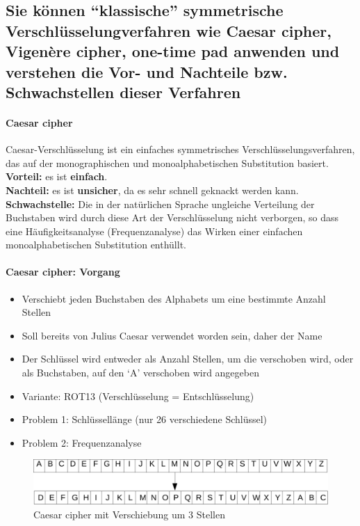 \documentclass[10pt,a4paper]{article}
\begin{document}
\subsection*{Sie können "`klassische"' symmetrische Verschlüsselungverfahren wie Caesar cipher, Vigenère cipher, one-time pad anwenden und verstehen die Vor- und Nachteile bzw. Schwachstellen dieser Verfahren}

\paragraph*{Caesar cipher}\label{para:Caesar cipher}Caesar-Verschlüsselung ist ein einfaches symmetrisches Verschlüsselungsverfahren, das auf der monographischen und monoalphabetischen Substitution basiert.\\
\textbf{Vorteil:} es ist \textbf{einfach}.\\
\textbf{Nachteil:} es ist \textbf{unsicher}, da es sehr schnell geknackt werden kann.\\
\textbf{Schwachstelle:} Die in der natürlichen Sprache ungleiche Verteilung der Buchstaben wird durch diese Art der Verschlüsselung nicht verborgen, so dass eine Häufigkeitsanalyse (Frequenzanalyse) das Wirken einer einfachen monoalphabetischen Substitution enthüllt.

\paragraph*{Caesar cipher: Vorgang}
\begin{itemize}[noitemsep,topsep=0pt,leftmargin=*]
    \item Verschiebt jeden Buchstaben des Alphabets um eine bestimmte Anzahl Stellen
    \item Soll bereits von Julius Caesar verwendet worden sein, daher der Name
    \item Der Schlüssel wird entweder als Anzahl Stellen, um die verschoben wird, oder als Buchstaben, auf den `A' verschoben wird angegeben
    \item Variante: ROT13 (Verschlüsselung = Entschlüsselung)
    \item Problem 1: Schlüssellänge (nur 26 verschiedene Schlüssel)
    \item Problem 2: Frequenzanalyse
\end{itemize}
\begin{figure}[H]
    \begin{center}
    \includegraphics[width=12cm]{images/caesar.png}
    \caption{Caesar cipher mit Verschiebung um 3 Stellen}
    \label{caesar}
    \end{center}
\end{figure}
\end{document}
